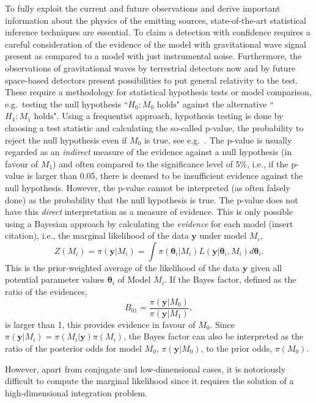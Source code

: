 \documentclass[%
 reprint,
 amsmath,amssymb,
 aps,
]{revtex4-2}
\def\btheta{\boldsymbol{\theta}}
\def\btheta{\boldsymbol{\theta}}
\def\ybold{\mathbf{y}}
\newcommand{\btheta}{\mbox{\boldmath $\theta$}}
\begin{document}
To fully exploit the current and future observations and derive important information about the physics of the emitting sources, state-of-the-art statistical inference techniques are essential. To claim a detection with confidence requires a careful consideration of the evidence of the model with gravitational wave signal present as compared to a model with just instrumental noise. Furthermore, the observations of gravitational waves by terrestrial detectors now and by future space-based detectors present possibilities to put general relativity to the test. These require a methodology for statistical hypothesis tests or model comparison, e.g.\ testing the null hypothesis ``$H_0: M_0\mbox{ holds}$" against the alternative ``$H_1: M_1 \mbox{ holds}$".  Using a frequentist approach, hypothesis testing is done by
choosing a test statistic and calculating the so-called
p-value, the probability to reject the null hypothesis even if $M_0$ is true, see e.g.\ \cite{alma9998701914002091}. The p-value is usually regarded as an {\em indirect} measure of
the evidence against a null hypothesis (in favour of $M_1$) and often compared to the significance level of 5\%, i.e., if the p-value is larger
than 0.05, there is deemed to be insufficient evidence against the null hypothesis. However, the p-value cannot be interpreted (as often falsely done) as the probability that the null hypothesis is true. The p-value does not have this {\em direct} interpretation as a measure of evidence. This is only possible using a Bayesian approach by calculating the {\em evidence} for each model (insert citation), i.e., the marginal likelihood of the data $\ybold$ under model $M_i$, \[Z(M_i)=\pi(\ybold|M_i)=\int \pi(\btheta
_i|M_i)L(\ybold|\btheta_i,M_i)d\btheta_i.\]
This is the prior-weighted average of the likelihood of the data $\ybold$ given all potential parameter values $\btheta_i$ of Model $M_i$.
If the Bayes factor, defined as the ratio of the evidences,
\[ B_{01}=\frac{\pi(\ybold|M_0)}{\pi(\ybold|M_1)},\]
is larger than 1, this provides evidence in favour of $M_0$. Since $\pi(\ybold|M_i)=\pi(M_i|\ybold)\pi(M_i)$,
the Bayes factor can also be interpreted as the ratio of the posterior odds for model $M_0$, $\pi(\ybold|M_0)$, to the prior odds, $\pi(M_0)$.

However, apart from conjugate and low-dimensional cases, it is notoriously difficult to compute the marginal likelihood since it requires the solution of a high-dimensional integration problem.
\end{document}
